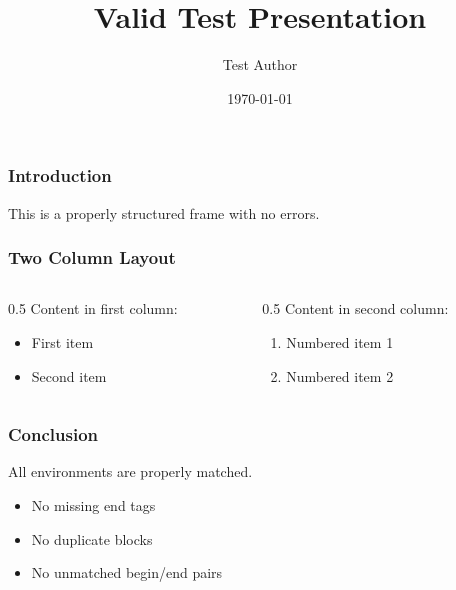 \documentclass{beamer}
\title{Valid Test Presentation}
\author{Test Author}
\date{\today}
\begin{document}
\begin{frame}
  \titlepage
\end{frame}

\begin{frame}
  \frametitle{Introduction}
  This is a properly structured frame with no errors.
\end{frame}

\begin{frame}
  \frametitle{Two Column Layout}
  \begin{columns}
    \begin{column}{0.5\textwidth}
      Content in first column:
      \begin{itemize}
        \item First item
        \item Second item
      \end{itemize}
    \end{column}
    \begin{column}{0.5\textwidth}
      Content in second column:
      \begin{enumerate}
        \item Numbered item 1
        \item Numbered item 2
      \end{enumerate}
    \end{column}
  \end{columns}
\end{frame}

\begin{frame}
  \frametitle{Conclusion}
  All environments are properly matched.
  \begin{itemize}
    \item No missing end tags
    \item No duplicate blocks
    \item No unmatched begin/end pairs
  \end{itemize}
\end{frame}
\end{document}

